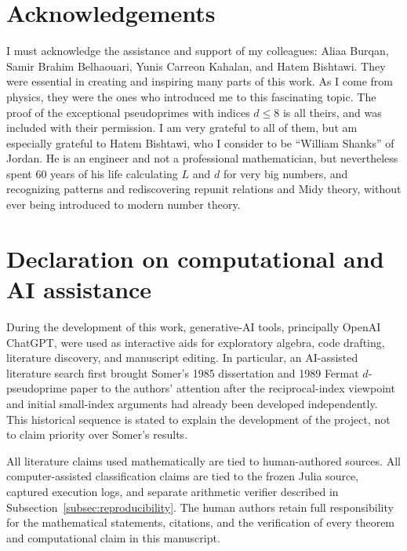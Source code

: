\documentclass[11pt]{article}
\begin{document}
\section*{Acknowledgements}

I must acknowledge the assistance and support of my colleagues: Aliaa Burqan, Samir Brahim
Belhaouari, Yunis Carreon Kahalan, and Hatem Bishtawi. They were essential in creating and
inspiring many parts of this work. As I come from physics, they were the ones who introduced
me to this fascinating topic. The proof of the exceptional pseudoprimes with indices
$d \le 8$ is all theirs, and was included with their permission. I am very grateful to all
of them, but am especially grateful to Hatem Bishtawi, who I consider to be ``William
Shanks'' of Jordan. He is an engineer and not a professional mathematician, but nevertheless
spent 60 years of his life calculating $L$ and $d$ for very big numbers, and recognizing
patterns and rediscovering repunit relations and Midy theory, without ever being introduced
to modern number theory.

\section*{Declaration on computational and AI assistance}

During the development of this work, generative-AI tools, principally OpenAI
ChatGPT, were used as interactive aids for exploratory algebra, code drafting,
literature discovery, and manuscript editing.  In particular, an AI-assisted
literature search first brought Somer's 1985 dissertation and 1989 Fermat
$d$-pseudoprime paper to the authors' attention after the reciprocal-index
viewpoint and initial small-index arguments had already been developed
independently.  This historical sequence is stated to explain the development
of the project, not to claim priority over Somer's results.

All literature claims used mathematically are tied to human-authored sources.
All computer-assisted classification claims are tied to the frozen Julia
source, captured execution logs, and separate arithmetic verifier described in
Subsection~\ref{subsec:reproducibility}.  The human authors retain full
responsibility for the mathematical statements, citations, and the
verification of every theorem and computational claim in this manuscript.
\end{document}
